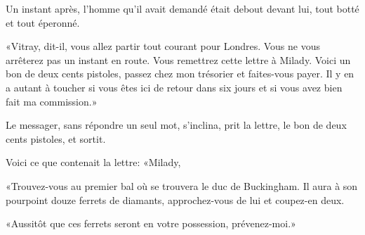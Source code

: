 Un instant après, l'homme qu'il avait demandé était debout devant lui, tout botté et tout éperonné. 

«Vitray, dit-il, vous allez partir tout courant pour Londres. Vous ne vous arrêterez pas un instant en route. Vous remettrez cette lettre à Milady. Voici un bon de deux cents pistoles, passez chez mon trésorier et faites-vous payer. Il y en a autant à toucher si vous êtes ici de retour dans six jours et si vous avez bien fait ma commission.» 

Le messager, sans répondre un seul mot, s'inclina, prit la lettre, le bon de deux cents pistoles, et sortit. 

Voici ce que contenait la lettre:  «Milady, 

«Trouvez-vous au premier bal où se trouvera le duc de Buckingham. Il aura à son pourpoint douze ferrets de diamants, approchez-vous de lui et coupez-en deux. 

«Aussitôt que ces ferrets seront en votre possession, prévenez-moi.» 